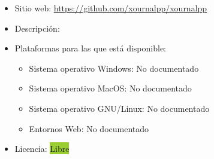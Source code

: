 \documentclass[11pt]{article}
\newcommand{\nodoc}{No documentado}
\newcommand{\libre}{\colorbox{YellowGreen}{Libre}}
\begin{document}
\begin{itemize}
\item Sitio web: \url{https://github.com/xournalpp/xournalpp}
\item Descripción:
\item Plataformas para las que está disponible:
  \begin{itemize}
  \item Sistema operativo Windows: \nodoc
  \item Sistema operativo MacOS: \nodoc
  \item Sistema operativo GNU/Linux: \nodoc
  \item Entornos Web: \nodoc
  \end{itemize}
\item Licencia: \libre
\end{itemize}
\end{document}
